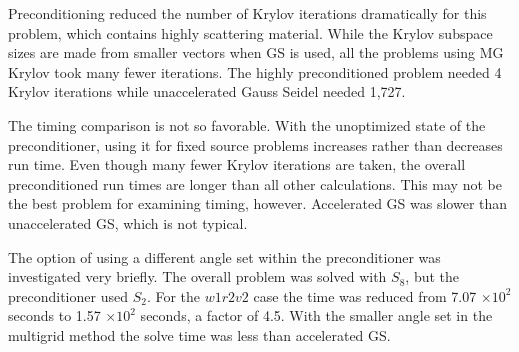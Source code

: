 Preconditioning reduced the number of Krylov iterations dramatically for this problem, which contains highly scattering material. While the Krylov subspace sizes are made from smaller vectors when GS is used, all the problems using MG Krylov took many fewer iterations. The highly preconditioned problem needed 4 Krylov iterations while unaccelerated Gauss Seidel needed 1,727.  

The timing comparison is not so favorable. With the unoptimized state of the preconditioner, using it for fixed source problems increases rather than decreases run time. Even though many fewer Krylov iterations are taken, the overall preconditioned run times are longer than all other calculations. This may not be the best problem for examining timing, however. Accelerated GS was slower than unaccelerated GS, which is not typical.

The option of using a different angle set within the preconditioner was investigated very briefly. The overall problem was solved with $S_{8}$, but the preconditioner used $S_{2}$. For the $w1r2v2$ case the time was reduced from 7.07 $\times 10^{2}$ seconds to 1.57 $\times 10^{2}$ seconds, a factor of 4.5. With the smaller angle set in the multigrid method the solve time was less than accelerated GS. 

